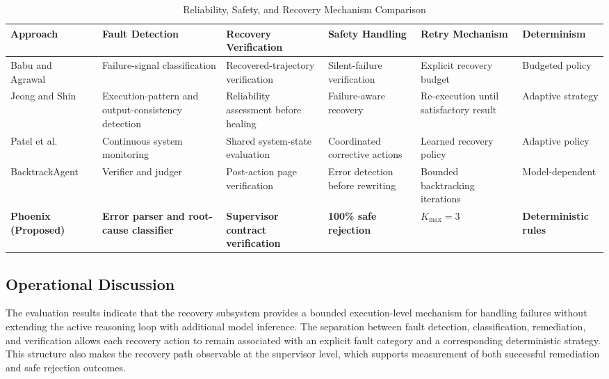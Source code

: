 \documentclass[conference]{IEEEtran}
\begin{document}
\begin{table}[t]
\centering
\caption{Reliability, Safety, and Recovery Mechanism Comparison}
\label{tab:safety_comparison}
\footnotesize
\begin{tabularx}{\textwidth}{p{}p{}p{}p{}p{}X}
\toprule
\textbf{Approach} & \textbf{Fault Detection} & \textbf{Recovery Verification} & \textbf{Safety Handling} & \textbf{Retry Mechanism} & \textbf{Determinism} \\
\midrule
Babu and Agrawal~\cite{babu2026} & Failure-signal classification & Recovered-trajectory verification & Silent-failure verification & Explicit recovery budget & Budgeted policy \\
Jeong and Shin~\cite{jeong2026} & Execution-pattern and output-consistency detection & Reliability assessment before healing & Failure-aware recovery & Re-execution until satisfactory result & Adaptive strategy \\
Patel et al.~\cite{patel2026b} & Continuous system monitoring & Shared system-state evaluation & Coordinated corrective actions & Learned recovery policy & Adaptive policy \\
BacktrackAgent~\cite{wu2025} & Verifier and judger & Post-action page verification & Error detection before rewriting & Bounded backtracking iterations & Model-dependent \\
\textbf{Phoenix (Proposed)} & \textbf{Error parser and root-cause classifier} & \textbf{Supervisor contract verification} & \textbf{100\% safe rejection} & \textbf{$K_{\text{max}} = 3$} & \textbf{Deterministic rules} \\
\bottomrule
\end{tabularx}
\end{table}

\subsection{Operational Discussion}
The evaluation results indicate that the recovery subsystem provides a bounded execution-level mechanism for handling failures without extending the active reasoning loop with additional model inference. The separation between fault detection, classification, remediation, and verification allows each recovery action to remain associated with an explicit fault category and a corresponding deterministic strategy. This structure also makes the recovery path observable at the supervisor level, which supports measurement of both successful remediation and safe rejection outcomes.
\end{document}
